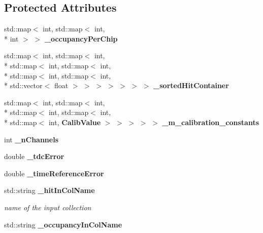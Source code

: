 \subsection*{Protected Attributes}
\begin{DoxyCompactItemize}
\item 
std\-::map$<$ int, std\-::map$<$ int, \\*
int $>$ $>$ {\bfseries \-\_\-occupancy\-Per\-Chip}\label{classCALICE_1_1Ahc2OccupancyCalibrator_a98fd37f253000919187fda7e0e1bfc91}

\item 
std\-::map$<$ int, std\-::map$<$ int, \\*
std\-::map$<$ int, std\-::map$<$ int, \\*
std\-::map$<$ int, std\-::map$<$ int, \\*
std\-::vector$<$ float $>$ $>$ $>$ $>$ $>$ $>$ $>$ {\bfseries \-\_\-sorted\-Hit\-Container}\label{classCALICE_1_1Ahc2OccupancyCalibrator_aa0007fc4dd8929013e30b6c17016eadd}

\item 
std\-::map$<$ int, std\-::map$<$ int, \\*
std\-::map$<$ int, std\-::map$<$ int, \\*
std\-::map$<$ int, {\bf Calib\-Value} $>$ $>$ $>$ $>$ $>$ {\bfseries \-\_\-m\-\_\-calibration\-\_\-constants}\label{classCALICE_1_1Ahc2OccupancyCalibrator_a80f0878a73713a22cb155cf976fe6b8b}

\item 
int {\bfseries \-\_\-n\-Channels}\label{classCALICE_1_1Ahc2OccupancyCalibrator_ab169b46b25955ef59442dc4b97a02366}

\item 
double {\bfseries \-\_\-tdc\-Error}\label{classCALICE_1_1Ahc2OccupancyCalibrator_a01e2a7ec01c030dcb734c71b56a1b75b}

\item 
double {\bfseries \-\_\-time\-Reference\-Error}\label{classCALICE_1_1Ahc2OccupancyCalibrator_a6f963856dff73e179c4d887798385d96}

\item 
std\-::string {\bf \-\_\-hit\-In\-Col\-Name}\label{classCALICE_1_1Ahc2OccupancyCalibrator_a7d75d3932599645dc6658795cc952deb}

\begin{DoxyCompactList}\small\item\em name of the input collection \end{DoxyCompactList}\item 
std\-::string {\bfseries \-\_\-occupancy\-In\-Col\-Name}\label{classCALICE_1_1Ahc2OccupancyCalibrator_a103e15d01b57c0f782e504b25eacd20f}


\end{DoxyCompactItemize}
